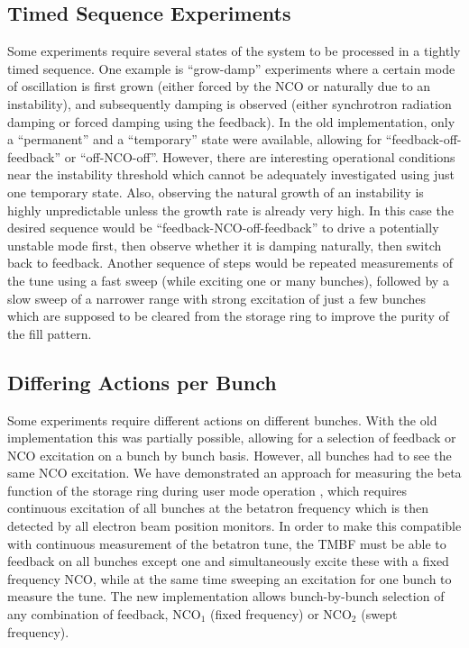 \documentclass{JAC2003}
\newcommand{\textsubscript}[1]{$_{\text{#1}}$}
\newcommand{\NCO}[1]{NCO\textsubscript{#1}}
\begin{document}
\subsection{Timed Sequence Experiments}

Some experiments require several states of the system to be processed in a
tightly timed sequence.  One example is ``grow-damp'' experiments where a
certain mode of oscillation is first grown (either forced by the NCO or
naturally due to an instability), and subsequently damping is observed (either
synchrotron radiation damping or forced damping using the feedback).  In the old
implementation, only a ``permanent'' and a ``temporary'' state were available,
allowing for ``feedback-off-feedback'' or ``off-NCO-off''.  However, there are
interesting operational conditions near the instability threshold which cannot
be adequately investigated using just one temporary state.  Also, observing the
natural growth of an instability is highly unpredictable unless the growth rate
is already very high.  In this case the desired sequence would be
``feedback-NCO-off-feedback'' to drive a potentially unstable mode first, then
observe whether it is damping naturally, then switch back to feedback.   Another
sequence of steps would be repeated measurements of the tune using a fast sweep
(while exciting one or many bunches), followed by a slow sweep of a narrower
range with strong excitation of just a few bunches which are supposed to be
cleared from the storage ring to improve the purity of the fill pattern.


\subsection{Differing Actions per Bunch}

Some experiments require different actions on different bunches.  With the old
implementation this was partially possible, allowing for a selection of feedback
or NCO excitation on a bunch by bunch basis.  However, all bunches had to see
the same NCO excitation.  We have demonstrated an approach for measuring the
beta function of the storage ring during user mode operation \cite{measurement},
which requires continuous excitation of all bunches at the betatron frequency
which is then detected by all electron beam position monitors.  In order to make
this compatible with continuous measurement of the betatron tune, the TMBF must
be able to feedback on all bunches except one and simultaneously excite these
with a fixed frequency NCO, while at the same time sweeping an excitation for
one bunch to measure the tune.  The new implementation allows bunch-by-bunch
selection of any combination of feedback, \NCO1 (fixed frequency) or \NCO2
(swept frequency).
\end{document}
